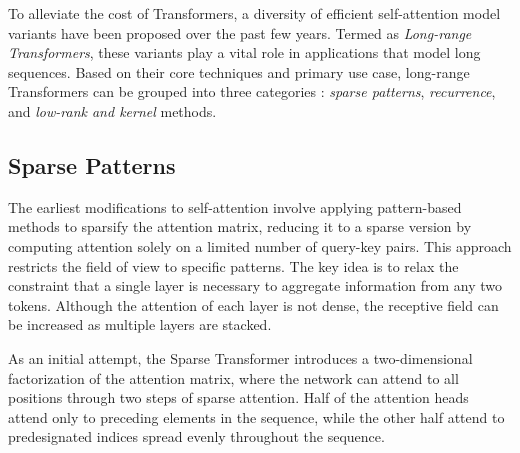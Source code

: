 To alleviate the cost of Transformers, a diversity of efficient self-attention model variants \citep{tay2020efficient} have been proposed over the past few years. Termed as \textit{Long-range Transformers}, these variants play a vital role in applications that model long sequences. Based on their core techniques and primary use case, long-range Transformers can be grouped into three categories \citep{qin2022nlp}: \textit{sparse patterns}, \textit{recurrence}, and \textit{low-rank and kernel} methods. 



\subsection{Sparse Patterns}

The earliest modifications to self-attention involve applying pattern-based methods to sparsify the attention matrix, reducing it to a sparse version by computing attention solely on a limited number of query-key pairs. This approach restricts the field of view to specific patterns.
The key idea is to relax the constraint that a single layer is necessary to aggregate information from any two tokens. Although the attention of each layer is not dense, the receptive field can be increased as multiple layers are stacked. 

As an initial attempt, the Sparse Transformer \citep{child2019generating} introduces a two-dimensional factorization of the attention matrix, where the network can attend to all positions through two steps of sparse attention. Half of the attention heads attend only to preceding elements in the sequence, while the other half attend to predesignated indices spread evenly throughout the sequence. 


